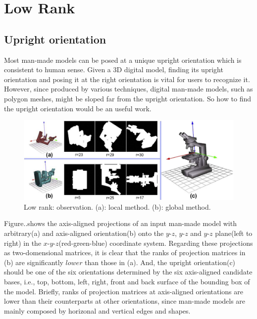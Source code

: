 \section{Low Rank}
\label{sec:LowRank}


\subsection{Upright orientation}
\label{subsec:upright orientation}

Most man-made models can be posed at a unique upright orientation which is consistent to human sense. Given a 3D digital model, finding its upright orientation and posing it at the right orientation is vital for users to recognize it. However, since produced by various techniques, digital man-made models, such as polygon meshes, might be sloped far from the upright orientation. So how to find the upright orientation would be an useful work.

\begin{figure}[ht]
  \centering
  \includegraphics[width=6in]{images/lowrank}
  \caption{Low rank: observation. (a): local method\cite{jin2012unsupervised}. (b): global method\cite{wang2014upright}.}
\end{figure}

Figure..shows the axis-aligned projections of an input man-made model with arbitrary(a) and axis-aligned orientation(b) onto the $y$-$z$, $y$-$z$ and $y$-$z$ plane(left to right) in the $x$-$y$-$z$(red-green-blue) coordinate system. Regarding these projections as two-domensional matrices, it is clear that the ranks of projection matrices in (b) are significantly $lower$ than those in (a). And, the upright orientation(c) should be one of the six orientations determined by the six axis-aligned candidate bases, i.e., top, bottom, left, right, front and back surface of the bounding box of the model. Briefly, ranks of projection matrices at axis-aligned orientations are lower than their counterparts at other orientations, since man-made models are mainly composed by horizonal and vertical edges and shapes.

